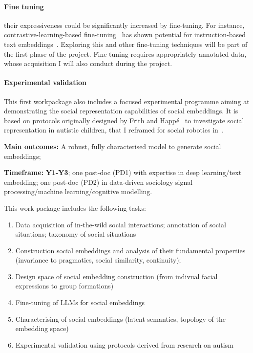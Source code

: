 \paragraph{Fine tuning} their expressiveness could be significantly increased by
fine-tuning. For instance, contrastive-learning-based
fine-tuning~\cite{hadsell2006dimensionality} has shown potential for
instruction-based text embeddings~\cite{canal2022survey}.  Exploring this and
other fine-tuning techniques will be part of the first phase of the project.
Fine-tuning requires appropriately annotated data, whose acquisition I will also
conduct during the project.

\paragraph{Experimental validation} This first workpackage also includes a
focused experimental programme aiming at demonstrating the social representation
capabilities of social embeddings. It is based on protocols originally designed
by Frith and Happé~\cite{frith1994autism} to investigate social representation
in autistic children, that I reframed for social robotics
in~\cite{lemaignan2015mutual}.


\begin{framed}
    \textbf{Main outcomes:} A robust, fully characterised model to generate
    social embeddings;

    \textbf{Timeframe:} \textbf{Y1-Y3}; one post-doc (PD1) with expertise in
    deep learning/text embedding; one post-doc (PD2) in data-driven sociology
signal processing/machine learning/cognitive modelling.
\end{framed}


This work package includes the following tasks:

\begin{enumerate}[label=\textbf{T1.\arabic*}]
    \item Data acquisition of in-the-wild social interactions; annotation of
        social situations; taxonomy of social situations
    \item Construction social embeddings and analysis of their fundamental
        properties (invariance to pragmatics, social similarity, continuity);
    \item Design space of social embedding construction (from indivual facial
        expressions to group formations)
    \item Fine-tuning of LLMs for social embeddings
    \item Characterising of social embeddings (latent semantics, topology of the
        embedding space)
    \item Experimental validation using protocols derived from research on
        autism
\end{enumerate}


